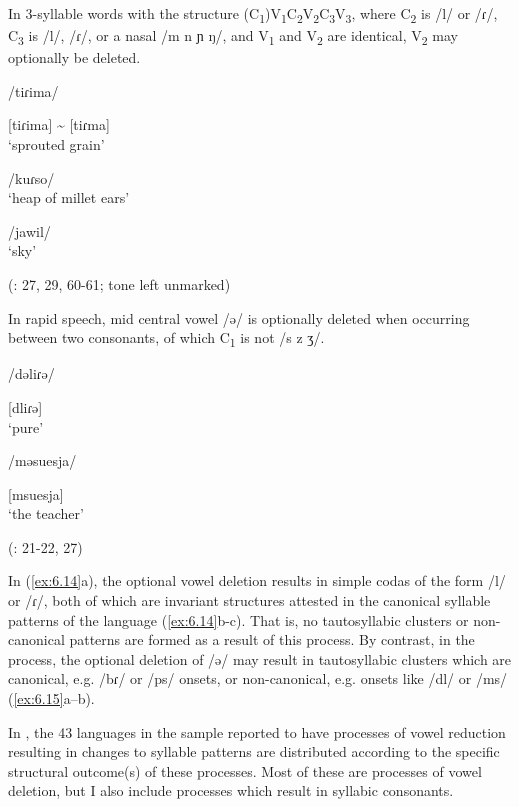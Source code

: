 \ea\label{ex:6.14}

  In 3-syllable words with the structure (C\textsubscript{1})V\textsubscript{1}C\textsubscript{2}V\textsubscript{2}C\textsubscript{3}V\textsubscript{3}, where C\textsubscript{2} is /l/ or /ɾ/, C\textsubscript{3} is /l/, /ɾ/, or a nasal /m n ɲ ŋ/, and V\textsubscript{1} and V\textsubscript{2} are identical, V\textsubscript{2} may optionally be deleted.

\ea  /tiɾima/

[tiɾima] {\textasciitilde} [tiɾma]\\
\glt ‘sprouted grain’

\ex  /kuɾso/\\
\glt ‘heap of millet ears’

\ex  /jawil/\\
\glt ‘sky’

(\citealt{Jakobi1990}: 27, 29, 60-61; tone left unmarked)
\z
\z

\ea\label{ex:6.15}

  In rapid speech, mid central vowel /ə/ is optionally deleted when occurring between two consonants, of which C\textsubscript{1} is not /s z ʒ/.

\ea  /dəliɾə/

[dliɾə]\\
\glt ‘pure’

\ex  /məsuesja/

[msuesja]\\
\glt ‘the teacher’

(\citealt{Klippenstein2010}: 21-22, 27)
\z
\z

  In  (\ref{ex:6.14}a), the optional vowel deletion results in simple codas of the form /l/ or /ɾ/, both of which are invariant structures attested in the canonical syllable patterns of the language (\ref{ex:6.14}b-c). That is, no tautosyllabic clusters or non-canonical patterns are formed as a result of this process. By contrast, in the  process, the optional deletion of /ə/ may result in tautosyllabic clusters which are canonical, e.g. /bɾ/ or /ps/ onsets, or non-canonical, e.g. onsets like /dl/ or /ms/ (\ref{ex:6.15}a--b).

  In , the 43 languages in the sample reported to have processes of vowel reduction resulting in changes to syllable patterns are distributed according to the specific structural outcome(s) of these processes. Most of these are processes of vowel deletion, but I also include processes which result in syllabic consonants.

